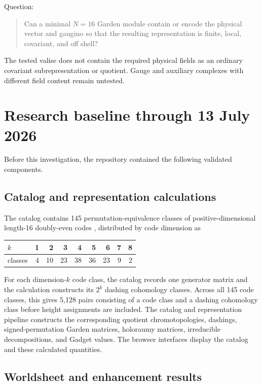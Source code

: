 \documentclass[11pt]{article}
\begin{document}
Question:

\begin{quote}
Can a minimal $N=16$ Garden module contain or encode the physical vector and
gaugino so that the resulting representation is finite, local, covariant, and
off shell?
\end{quote}

The tested valise does not contain the required physical fields as an ordinary
covariant subrepresentation or quotient.  Gauge and auxiliary complexes with
different field content remain untested.

\section{Research baseline through 13 July 2026}

Before this investigation, the repository contained the following validated
components.

\subsection{Catalog and representation calculations}

The catalog contains 145 permutation-equivalence classes of positive-dimensional
length-16 doubly-even codes \cite{doran2008topology}, distributed by code dimension as

\begin{center}
\begin{tabular}{@{}lrrrrrrrr@{}}
\toprule
$k$ & 1 & 2 & 3 & 4 & 5 & 6 & 7 & 8 \\
\midrule
classes & 4 & 10 & 23 & 38 & 36 & 23 & 9 & 2 \\
\bottomrule
\end{tabular}
\end{center}

For each dimension-$k$ code class, the catalog records one generator matrix and
the calculation constructs its $2^k$ dashing cohomology classes.  Across all
145 code classes, this gives 5,128 pairs consisting of a code class and a
dashing cohomology class before height
assignments are included.  The catalog and representation pipeline constructs the corresponding
quotient chromotopologies, dashings, signed-permutation Garden matrices,
holoraumy matrices, irreducible decompositions, and Gadget values.  The browser
interfaces display the catalog and these calculated quantities.

\subsection{Worldsheet and enhancement results}
\end{document}
